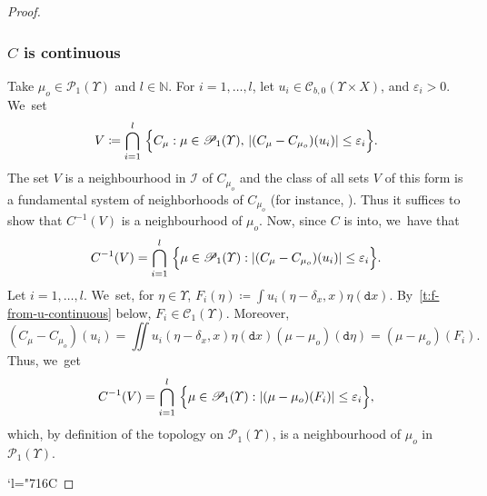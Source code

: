 \documentclass[JEP,XML,SOM,Unicode,published]{cedram}
\newcommand{\Changelback}{\mathcode`l="716C}
\theoremstyle{definition}
\theoremstyle{remark}
\DeclarePairedDelimiter{\set}{\lbrace}{\rbrace}
\DeclarePairedDelimiter{\abs}{\lvert}{\rvert}
\begin{document}
\begin{proof}
\subsubsection*{$C$ is continuous}
Take $\mu_{o} \in \mathscr{P}_{1}(\varUpsilon)$ and $l \in \mathbb{N}$.
For $i=1,\dots,l$, let $u_{i} \in \mathscr{C}_{b,0}(\varUpsilon \times X)$, and $\varepsilon_{i} > 0$. We~set
\begin{equation*}
V \coloneq \bigcap_{i=1}^{l} \ \set[\Big]{ C_{\mu} : \mu \in \mathscr{P}_{1}(\varUpsilon),\, \abs{(C_{\mu} - C_{\mu_{o}})(u_{i})} \leq \varepsilon_{i}}.
\end{equation*}
The set $V$ is a neighbourhood in $\mathscr{I}$ of $C_{\mu_{o}}$ and the class of all sets $V$ of this form is a fundamental system of neighborhoods of $C_{\mu_{o}}$ (for instance, \cite[II, pp.\,2-4]{BourbakiIntegration}).
Thus it suffices to show that $C^{-1}(V)$ is a neighbourhood of $\mu_{o}$.
Now, since $C$ is into, we~have that
\begin{equation*}
C^{-1}(V) = \bigcap_{i=1}^{l} \ \set[\Big]{ \mu \in \mathscr{P}_{1}(\varUpsilon) : \abs{(C_{\mu} - C_{\mu_{o}})(u_{i})} \leq \varepsilon_{i} }.
\end{equation*}
Let $i = 1,\dots, l$. We~set, for $\eta \in \varUpsilon$, $F_{i}(\eta) \coloneq \int u_{i}(\eta - \delta_{x}, x) \eta(\mathtt{d} x)$.
By~\cref{t:f-from-u-continuous} below, $F_{i} \in \mathscr{C}_{1}(\varUpsilon)$.
Moreover,
\begin{equation*}
(C_{\mu} - C_{\mu_{o}})(u_{i}) = \iint u_{i}(\eta-\delta_{x}, x) \eta(\mathtt{d} x)(\mu - \mu_{o})(\mathtt{d} \eta) = (\mu - \mu_{o})(F_{i}).
\end{equation*}
Thus, we~get
\begin{equation*}
C^{-1}(V) = \bigcap_{i=1}^{l} \ \set[\Big]{ \mu \in \mathscr{P}_{1}(\varUpsilon) : \abs{(\mu - \mu_{o})(F_{i})} \leq \varepsilon_{i}},
\end{equation*}
which, by definition of the topology on $\mathscr{P}_{1}(\varUpsilon)$, is a neighbourhood of $\mu_{o}$ in $\mathscr{P}_{1}(\varUpsilon)$.

\Changelback

\end{proof}
\end{document}
